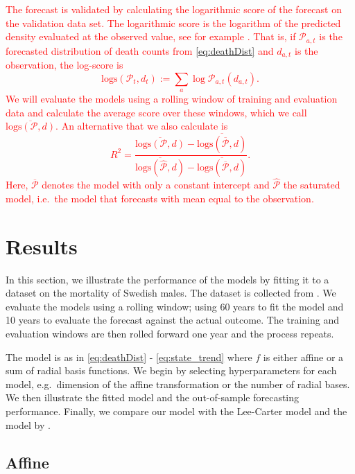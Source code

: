 \documentclass[11pt]{article}
\begin{document}
\textcolor{red}{The forecast is validated by calculating the logarithmic score of the forecast on the validation data set. The logarithmic score is the logarithm of the predicted density evaluated at the observed value, see for example \cite{gneiting2007strictly}. That is, if $\mathcal P_{a,t}$ is the forecasted distribution of death counts from \eqref{eq:deathDist} and $d_{a,t}$ is the observation, the log-score is
$$
\text{logs}(\mathcal P_{t}, d_{t}) := \sum_a \log \mathcal P_{a,t}(d_{a,t}).
$$
We will evaluate the models using a rolling window of training and evaluation data and calculate the average score over these windows, which we call $\overline{ \text{logs}(\mathcal P, d) }$. An alternative that we also calculate is
$$
R^2 = \frac{\overline{ \text{logs}(\mathcal P, d) } - \overline{ \text{logs}(\overline{\mathcal P}, d) }}{\overline{ \text{logs}(\widehat{\mathcal P}, d) } - \overline{ \text{logs}(\overline{\mathcal P}, d) }}.
$$
Here, $\overline{\mathcal P}$ denotes the model with only a constant intercept and $\widehat{\mathcal P}$ the saturated model, i.e.\ the model that forecasts with mean equal to the observation.}

\section{Results}\label{sec:results}

In this section, we illustrate the performance of the models by fitting it to a dataset on the mortality of Swedish males. The dataset is collected from \cite{hmd2018data}. We evaluate the models using a rolling window; using 60 years to fit the model and 10 years to evaluate the forecast against the actual outcome. The training and evaluation windows are then rolled forward one year and the process repeats.

The model is as in \eqref{eq:deathDist} - \eqref{eq:state_trend} where $f$ is either affine or a sum of radial basis functions. We begin by selecting hyperparameters for each model, e.g.\ dimension of the affine transformation or the number of radial bases. We then illustrate the fitted model and the out-of-sample forecasting performance. Finally, we compare our model with the Lee-Carter model and the model by \cite{plat2009stochastic}.

\subsection{Affine}\label{seq:results_sweden}
\end{document}
